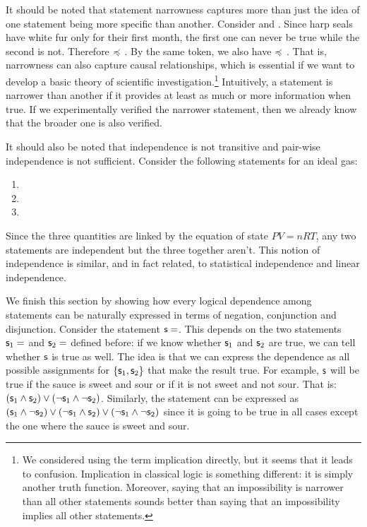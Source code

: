 \documentclass[11pt,letterpaper,fleqn]{memoir} %
\begin{document}
It should be noted that statement narrowness captures more than just the idea of one statement being more specific than another. Consider  and . Since harp seals have white fur only for their first month, the first one can never be true while the second is not. Therefore  $\preccurlyeq$ . By the same token, we also have  $\preccurlyeq$ . That is, narrowness can also capture causal relationships, which is essential if we want to develop a basic theory of scientific investigation.\footnote{We considered using the term implication directly, but it seems that it leads to confusion. Implication in classical logic is something different: it is simply another truth function. Moreover, saying that an impossibility is narrower than all other statements sounds better than saying that an impossibility implies all other statements.} Intuitively, a statement is narrower than another if it provides at least as much or more information when true. If we experimentally verified the narrower statement, then we already know that the broader one is also verified.

It should also be noted that independence is not transitive and pair-wise independence is not sufficient. Consider the following statements for an ideal gas:
\begin{enumerate}
	\item {}
	\item {}
	\item {}
\end{enumerate}
Since the three quantities are linked by the equation of state $PV=nRT$, any two statements are independent but the three together aren't. This notion of independence is similar, and in fact related, to statistical independence and linear independence.

We finish this section by showing how every logical dependence among statements can be naturally expressed in terms of negation, conjunction and disjunction. Consider the statement $\mathsf{s}=$. This depends on the two statements $\mathsf{s}_1=$ and $\mathsf{s}_2=$ defined before: if we know whether $\mathsf{s}_1$ and $\mathsf{s}_2$ are true, we can tell whether $\mathsf{s}$ is true as well. The idea is that we can express the dependence as all possible assignments for $\{\mathsf{s}_1, \mathsf{s}_2 \}$ that make the result true. For example, $\mathsf{s}$ will be true if the sauce is sweet and sour or if it is not sweet and not sour. That is: $(\mathsf{s}_1 \wedge \mathsf{s}_2) \vee (\neg \mathsf{s}_1 \wedge \neg \mathsf{s}_2)$. Similarly, the statement  can be expressed as $(\mathsf{s}_1 \wedge \neg \mathsf{s}_2) \vee (\neg \mathsf{s}_1 \wedge \mathsf{s}_2) \vee (\neg \mathsf{s}_1 \wedge \neg \mathsf{s}_2)$ since it is going to be true in all cases except the one where the sauce is sweet and sour.
\end{document}
